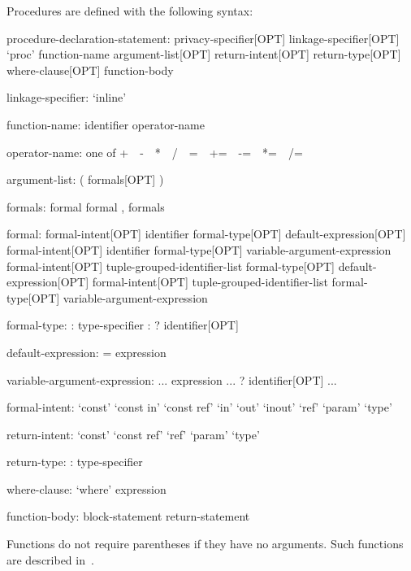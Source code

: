 Procedures are defined with the following syntax:
\begin{syntax}
procedure-declaration-statement:
  privacy-specifier[OPT] linkage-specifier[OPT] `proc' function-name argument-list[OPT] return-intent[OPT] return-type[OPT] where-clause[OPT]
    function-body

linkage-specifier:
  `inline'

function-name:
  identifier
  operator-name

operator-name: one of
  + $ $ $ $ - $ $ $ $ * $ $ $ $ / $ $ $ $ %
  = $ $ $ $ += $ $ $ $ -= $ $ $ $ *= $ $ $ $ /= $ $ $ $ %

argument-list:
  ( formals[OPT] )

formals:
  formal
  formal , formals

formal:
  formal-intent[OPT] identifier formal-type[OPT] default-expression[OPT]
  formal-intent[OPT] identifier formal-type[OPT] variable-argument-expression
  formal-intent[OPT] tuple-grouped-identifier-list formal-type[OPT] default-expression[OPT]
  formal-intent[OPT] tuple-grouped-identifier-list formal-type[OPT] variable-argument-expression

formal-type:
  : type-specifier
  : ? identifier[OPT]

default-expression:
  = expression

variable-argument-expression:
  ... expression
  ... ? identifier[OPT]
  ...

formal-intent:
  `const'
  `const in'
  `const ref'
  `in'
  `out'
  `inout'
  `ref'
  `param'
  `type'

return-intent:
  `const'
  `const ref'
  `ref'
  `param'
  `type'

return-type:
  : type-specifier

where-clause:
  `where' expression

function-body:
  block-statement
  return-statement
\end{syntax}


Functions do not require parentheses if they have no arguments.  Such
functions are described in~.

